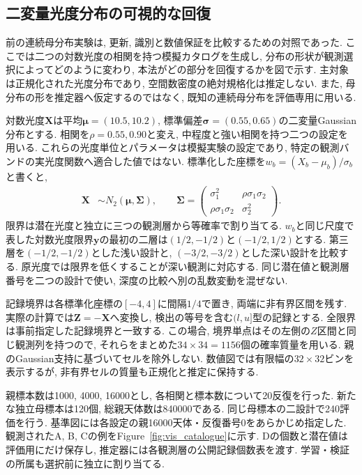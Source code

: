 \FloatBarrier
\subsection{二変量光度分布の可視的な回復}
\label{subsec:vis_luminosity_benchmark}

前の連続母分布実験は, 更新, 識別と数値保証を比較するための対照であった. ここでは二つの対数光度の相関を持つ模擬カタログを生成し, 分布の形状が観測選択によってどのように変わり, 本法がどの部分を回復するかを図で示す. 主対象は正規化された光度分布であり, 空間数密度の絶対規格化は推定しない. また, 母分布の形を推定器へ仮定するのではなく, 既知の連続母分布を評価専用に用いる.

対数光度$\bm X$は平均$\bm\mu=(10.5,10.2)$, 標準偏差$\bm\sigma=(0.55,0.65)$の二変量Gaussian分布とする. 相関を$\rho=0.55,0.90$と変え, 中程度と強い相関を持つ二つの設定を用いる. これらの光度単位とパラメータは模擬実験の設定であり, 特定の観測バンドの実光度関数へ適合した値ではない. 標準化した座標を$w_b=(X_b-\mu_b)/\sigma_b$と書くと,
\begin{align}
\bm X&\sim N_2(\bm\mu,\bm\Sigma),\qquad
\bm\Sigma=\begin{pmatrix}
\sigma_1^2&\rho\sigma_1\sigma_2\\
\rho\sigma_1\sigma_2&\sigma_2^2
\end{pmatrix}.
\label{eq:vis_gaussian_parent}
\end{align}
限界は潜在光度と独立に三つの観測層から等確率で割り当てる. $w_b$と同じ尺度で表した対数光度限界$\bm y$の最初の二層は$(1/2,-1/2)$と$(-1/2,1/2)$とする. 第三層を$(-1/2,-1/2)$とした浅い設計と, $(-3/2,-3/2)$とした深い設計を比較する. 原光度では限界を低くすることが深い観測に対応する. 同じ潜在値と観測層番号を二つの設計で使い, 深度の比較へ別の乱数変動を混ぜない.

記録境界は各標準化座標の$[-4,4]$に間隔$1/4$で置き, 両端に非有界区間を残す. 実際の計算では$\bm Z=-\bm X$へ変換し, 検出の等号を含む$(l,u]$型の記録とする. 全限界は事前指定した記録境界と一致する. この場合, 境界単点はその左側の$Z$区間と同じ観測列を持つので, それらをまとめた$34\times34=1156$個の確率質量を用いる. 親のGaussian支持に基づいてセルを除外しない. 数値図では有限幅の$32\times32$ビンを表示するが, 非有界セルの質量も正規化と推定に保持する.

親標本数は1000, 4000, 16000とし, 各相関と標本数について20反復を行った. 新たな独立母標本は120個, 総親天体数は840000である. 同じ母標本の二設計で240評価を行う. 基準図には各設定の親16000天体・反復番号0をあらかじめ指定した. 観測されたA, B, Cの例をFigure~\ref{fig:vis_catalogue}に示す. Dの個数と潜在値は評価用にだけ保存し, 推定器には各観測層の公開記録個数表を渡す. 学習・検証の所属も選択前に独立に割り当てる.


